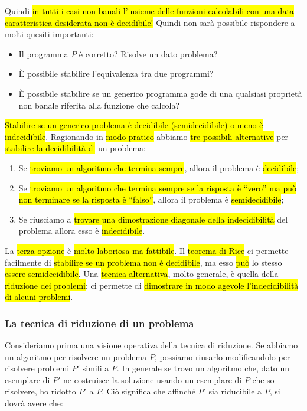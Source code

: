\documentclass[a4paper,11pt,twoside]{article}
\theoremstyle{plain}
\theoremstyle{definition}
\theoremstyle{remark}
\begin{document}
Quindi \hl{in tutti i casi non banali l'insieme delle funzioni calcolabili con
una data caratteristica desiderata non è decidibile!} Quindi non sarà possibile
rispondere a molti quesiti importanti:

\begin{itemize}
  \item Il programma $P$ è corretto? Risolve un dato problema?
  \item È possibile stabilire l'equivalenza tra due programmi?
  \item È possibile stabilire se un generico programma gode di una qualsiasi
    proprietà non banale riferita alla funzione che calcola?
\end{itemize}

\hl{Stabilire se un generico problema è decidibile (semidecidibile) o meno è
indecidibile}. Ragionando in \hl{modo pratico} abbiamo \hl{tre possibili
alternative} per \hl{stabilire la decidibilità di} un problema:

\begin{enumerate}
  \item Se \hl{troviamo un algoritmo che termina sempre}, allora il problema è
    \hl{decidibile};
  \item Se \hl{troviamo un algoritmo che termina sempre se la risposta è
    ``vero'' ma può non terminare se la risposta è ``falso''}, allora il
    problema è \hl{semidecidibile};
  \item Se riusciamo a \hl{trovare una dimostrazione diagonale della
    indecidibilità} del problema allora esso è \hl{indecidibile}.
\end{enumerate}

La \hl{terza opzione} è \hl{molto laboriosa ma fattibile}. Il \hl{teorema di
Rice} ci permette facilmente di \hl{stabilire se un problema non è decidibile},
ma esso \hl{può} lo stesso \hl{essere semidecidibile}. Una \hl{tecnica
alternativa}, molto generale, è quella della \hl{riduzione dei problemi}: ci
permette di \hl{dimostrare in modo agevole l'indecidibilità di alcuni problemi}.

\subsubsection{La tecnica di riduzione di un problema}\label{sec:riduzione}

Consideriamo prima una visione operativa della tecnica di riduzione. Se abbiamo
un algoritmo per risolvere un problema $P$, possiamo riusarlo modificandolo per
risolvere problemi $P'$ simili a $P$. In generale se trovo un algoritmo che,
dato un esemplare di $P'$ ne costruisce la soluzione usando un esemplare di $P$
che so risolvere, ho ridotto $P'$ a $P$. Ciò significa che affinché $P'$ sia
riducibile a $P$, si dovrà avere che:
\end{document}
